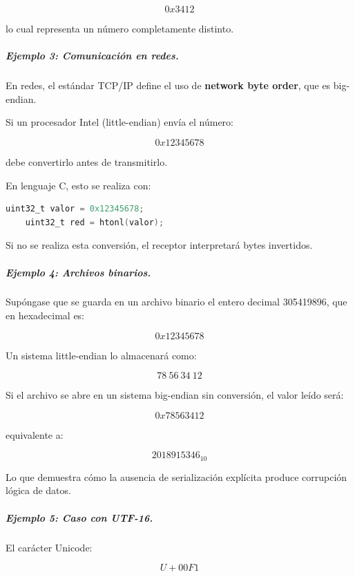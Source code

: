 \documentclass[12pt,twoside]{book}
\begin{document}
						\[
						0x3412
						\]
						
						lo cual representa un número completamente distinto.
						
						
						\subparagraph{Ejemplo 3: Comunicación en redes.} En redes, el estándar TCP/IP define el uso de \textbf{network byte order}, que es big-endian.
						
						Si un procesador Intel (little-endian) envía el número:
						
						\[
						0x12345678
						\]
						
						debe convertirlo antes de transmitirlo.
						
						En lenguaje C, esto se realiza con:
						
						\begin{lstlisting}[language=C]
	uint32_t valor = 0x12345678;
	uint32_t red = htonl(valor); \end{lstlisting}
						
						Si no se realiza esta conversión, el receptor interpretará bytes invertidos.
						
						
						\subparagraph{Ejemplo 4: Archivos binarios. }Supóngase que se guarda en un archivo binario el entero decimal 305419896, que en hexadecimal es:
						
						\[
						0x12345678
						\]
						
						Un sistema little-endian lo almacenará como:
						
						\[
						78\ 56\ 34\ 12
						\]
						
						Si el archivo se abre en un sistema big-endian sin conversión, el valor leído será:
						
						\[
						0x78563412
						\]
						
						equivalente a:
						
						\[
						2018915346_{10}
						\]
						
						Lo que demuestra cómo la ausencia de serialización explícita produce corrupción lógica de datos.
						
						
						\subparagraph{Ejemplo 5: Caso con UTF-16.} El carácter Unicode:
						
						\[
						U+00F1
						\]
						
\end{document}
